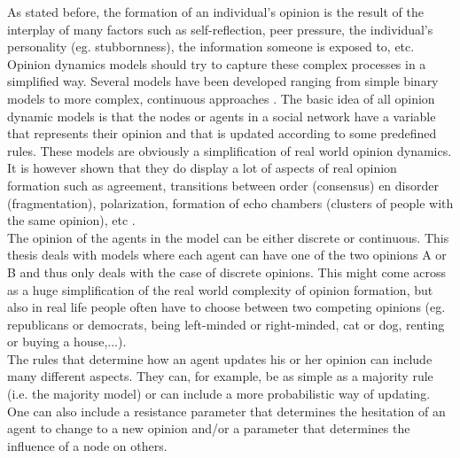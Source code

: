 \documentclass[11 pt , letterpaper , twoside , openright]{book}
\begin{document}
As stated before, the formation of an individual's opinion is the result of the interplay of many factors such as self-reflection, peer pressure, the individual's personality (eg. stubbornness), the information someone is exposed to, etc.  Opinion dynamics models should try to capture these complex processes in a simplified way. Several models have been developed ranging from simple binary models to more complex, continuous approaches \cite{Sirbu2016}. The basic idea of all opinion dynamic models is that the nodes or agents in a social network have a variable that represents their opinion and that is updated according to some predefined rules. These models are obviously a simplification of real world opinion dynamics. It is however shown that they do display a lot of aspects of real opinion formation such as agreement, transitions between order (consensus) en disorder (fragmentation), polarization, formation of echo chambers (clusters of people with the same opinion), etc \cite{Sirbu2016}. \\
The opinion of the agents in the model can be either discrete or continuous. This thesis deals with models where each agent can have one of the two opinions A or B and thus only deals with the case of discrete opinions. This might come across as a huge simplification of the real world complexity of opinion formation, but also in real life people often have to choose between two competing opinions (eg. republicans or democrats, being left-minded or right-minded, cat or dog, renting or buying a house,...). \\
The rules that determine how an agent updates his or her opinion can include many different aspects. They can, for example, be as simple as a majority rule (i.e. the majority model) or can include a more probabilistic way of updating. One can also include a resistance parameter that determines the hesitation of an agent to change to a new opinion and/or a parameter that determines the influence of a node on others. %
\end{document}
